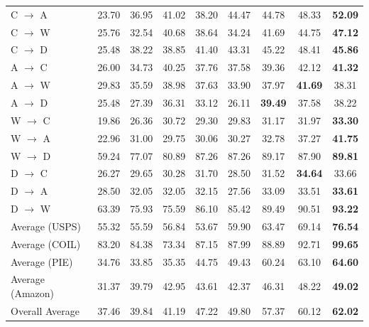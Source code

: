 \documentclass[10pt,twocolumn,letterpaper]{article}
\begin{document}
\begin{CJK*}{UTF8}{gkai}
\begin{table}[h!]
{\begin{tabular}{|l |c |c |c| c |c |c | c| c|}
			C $\rightarrow$ A&  23.70&	36.95&	41.02&	38.20&	44.47&	44.78&	48.33&	\textbf{ 52.09}
			\\
			C $\rightarrow$ W&  25.76&	32.54&	40.68&	38.64&	34.24&	41.69&	44.75&	\textbf{ 47.12}
			\\
			C $\rightarrow$ D&  25.48&	38.22&	38.85&	41.40&	43.31&	45.22&	48.41&	\textbf{ 45.86}
			\\
			A $\rightarrow$ C&  26.00&	34.73&	40.25&	37.76&	37.58&	39.36&	42.12&	\textbf{ 41.32}
			\\
			A $\rightarrow$ W&  29.83&	35.59&	38.98&	37.63&	33.90&	37.97&	\textbf{41.69}&	38.31
			\\
			A $\rightarrow$ D&  25.48&	27.39&	36.31&	33.12&	26.11&	\textbf{39.49}&	37.58&	38.22
			\\
			W $\rightarrow$ C&  19.86&	26.36&	30.72&	29.30&	29.83&	31.17&	31.97&	\textbf{ 33.30}
			\\
			W $\rightarrow$ A&  22.96&	31.00&	29.75&	30.06&	30.27&	32.78&	37.27&	\textbf{ 41.75}
			\\
			W $\rightarrow$ D&  59.24&	77.07&	80.89&	87.26&	87.26&	89.17&	87.90&	\textbf{ 89.81}
			\\
			D $\rightarrow$ C&  26.27&	29.65&	30.28&	31.70&	28.50&	31.52&	\textbf{ 34.64}&	33.66
			\\
			D $\rightarrow$ A & 28.50&	32.05&	32.05&	32.15&	27.56&	33.09&	33.51&	\textbf{ 33.61}
			\\
			D $\rightarrow$ W & 63.39&	75.93&	75.59&	86.10&	85.42&	89.49&	90.51&	\textbf{ 93.22}
			\\
			\hline
			\hline
			Average (USPS)& 55.32&	55.59&	56.84&	53.67&	59.90&	63.47&	69.14&	\textbf{ 76.54}
			\\
			Average (COIL)& 83.20&	84.38&	73.34&	87.15&	87.99&	88.89&	92.71&	\textbf{ 99.65}
			\\
			Average (PIE)& 34.76&	33.85&	35.35&	44.75&	49.43&	60.24&	63.10&	\textbf{ 64.60}
			\\
			Average (Amazon)&  31.37&	39.79&	42.95&	43.61&	42.37&	46.31&	48.22&	\textbf{ 49.02}
			\\
			
			Overall Average&     37.46&	39.84&	41.19&	47.22&	49.80&	57.37&	60.12&	\textbf{ 62.02}
			\\
			\bottomrule
		\end{tabular}}
		
	\end{table}
	

\end{CJK*}
\end{document}
